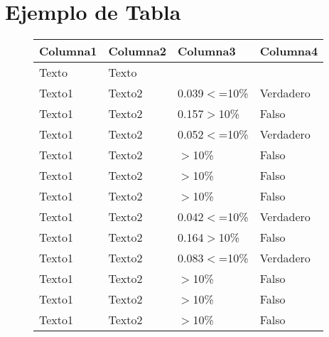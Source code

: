 \documentclass[12pt]{article}
\begin{document}
\section{Ejemplo de Tabla}
\lipsum[1-2]
\begin{figure}[!htb]
	\centering
	\def\arraystretch{1.2}
	\begin{tabular}{P{1.5cm} P{1.5cm} P{2cm} P{1.5cm}}
		\hline \centering
			 \textbf{Columna1 } & \textbf{Columna2 } & \textbf{Columna3} & \textbf{Columna4}\\ \hline%
			Texto &  Texto & & \\ \hline %
			Texto1 &  Texto2 & 0.039$<$=10\% & Verdadero\\ 
			Texto1 &  Texto2 & 0.157$>$10\% & Falso\\ 
			Texto1 &  Texto2 & 0.052$<$=10\% & Verdadero\\ \hline %
			Texto1 &  Texto2 & $>$10\% & Falso\\ 
			Texto1 &  Texto2 & $>$10\% & Falso\\ 
			Texto1 &  Texto2 & $>$10\% & Falso\\ \hline %
			Texto1 &  Texto2 & 0.042$<$=10\% & Verdadero\\ 
			Texto1 &  Texto2 & 0.164$>$10\% & Falso\\ 
			Texto1 &  Texto2 & 0.083$<$=10\% & Verdadero\\ \hline %
			Texto1 &  Texto2 & $>$10\% & Falso\\ 
			Texto1 &  Texto2 & $>$10\% & Falso\\ 
			Texto1 &  Texto2 & $>$10\% & Falso\\ \hline %
	\end{tabular}
\end{figure}
\end{document}
